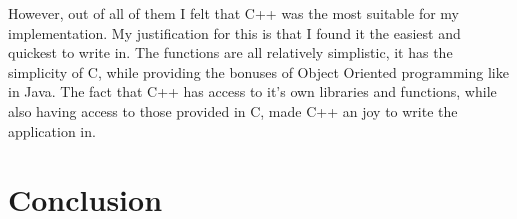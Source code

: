 \documentclass{article}
\begin{document}
However, out of all of them I felt that C++  was the most suitable for my implementation. My justification for this is that I found it the easiest and quickest to write in. The functions are all relatively simplistic, it has the simplicity of C, while providing the bonuses of Object Oriented programming like in Java. The fact that C++ has access to it's own libraries and functions, while also having access to those provided in C, made C++ an joy to write the application in.




\clearpage

\section{Conclusion}


\clearpage


\begin{thebibliography}{1}



\end{thebibliography}
\end{document}
